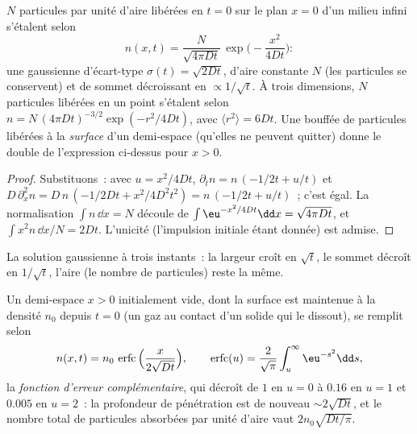 \begin{proposition}\label{prop:b2:particle-diffusion:gaussian}
$N$ particules par unité d'aire libérées en $t = 0$ sur le plan $x = 0$
d'un milieu infini s'étalent selon
\[
n(x,t) = \frac{N}{\sqrt{4\pi D t}}\,\exp\Big(-\frac{x^2}{4Dt}\Big) :
\]
une gaussienne d'écart-type $\sigma(t) = \sqrt{2Dt}$, d'aire constante
$N$ (les particules se conservent) et de sommet décroissant en $\propto
1/\sqrt t$. À trois dimensions, $N$ particules libérées en un point
s'étalent selon $n = N\,(4\pi Dt)^{-3/2}\exp(-r^2/4Dt)$, avec $\langle r^2
\rangle = 6Dt$. Une bouffée de particules libérées à la \emph{surface}
d'un demi-espace (qu'elles ne peuvent quitter) donne le double de l'expression ci-dessus
pour $x > 0$.
\end{proposition}

\begin{proof}
Substituons~: avec $u = x^2/4Dt$, $\partial_t n = n\,(-1/2t + u/t)$ et
$D\,\partial_x^2 n = D\,n\,(-1/2Dt + x^2/4D^2t^2) = n\,(-1/2t + u/t)$~;
c'est égal. La normalisation $\int n\,\dd x = N$ découle de $\int
\eu^{-x^2/4Dt}\dd x = \sqrt{4\pi Dt}$, et $\int x^2 n\,\dd x/N = 2Dt$.
L'unicité (l'impulsion initiale étant donnée) est admise.
\end{proof}

\begin{omfigure}

{\small La solution gaussienne à trois instants~: la largeur croît en
$\sqrt t$, le sommet décroît en $1/\sqrt t$, l'aire (le nombre de
particules) reste la même.}
\end{omfigure}

\begin{proposition}\label{prop:b2:particle-diffusion:erfc}
Un demi-espace $x > 0$ initialement vide, dont la surface est maintenue à la
densité $n_0$ depuis $t = 0$ (un gaz au contact d'un solide qui le
dissout), se remplit selon
\[
n(x,t) = n_0\,\operatorname{erfc}\Big(\frac{x}{2\sqrt{Dt}}\Big),
\qquad
\operatorname{erfc}(u) = \frac{2}{\sqrt\pi}\int_u^{\infty}\eu^{-s^2}\dd s,
\]
la \emph{fonction d'erreur complémentaire}, qui décroît de $1$ en $u =
0$ à $0.16$ en $u = 1$ et $0.005$ en $u = 2$~: la profondeur de pénétration est
de nouveau $\sim 2\sqrt{Dt}$, et le nombre total de particules absorbées par
unité d'aire vaut $2n_0\sqrt{Dt/\pi}$.
\end{proposition}

